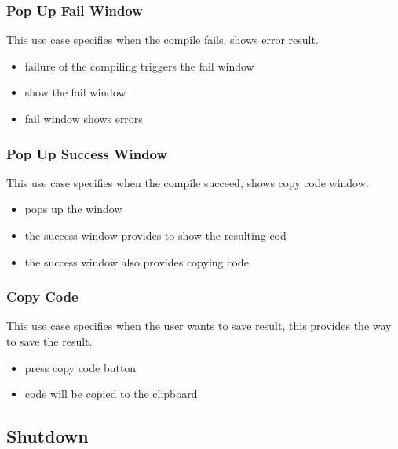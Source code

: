 \documentclass[conference]{IEEEtran}
\begin{document}
\subsubsection{Pop Up Fail Window}
This use case specifies when the compile fails, shows error result.
\begin{itemize}
  \item failure of the compiling triggers the fail window
  \item show the fail window
  \item fail window shows errors
\end{itemize}
\textit{}



\subsubsection{Pop Up Success Window}
This use case specifies when the compile succeed, shows copy code window.
\begin{itemize}
  \item pops up the window
  \item the success window provides to show the resulting cod
  \item the success window also provides copying code
\end{itemize}
\textit{}

\subsubsection{Copy Code}
This use case specifies when the user wants to save result, this provides the way to save the result.
\begin{itemize}
  \item press copy code button
  \item code will be copied to the clipboard
\end{itemize}
\textit{}


\subsection{Shutdown}
\end{document}
